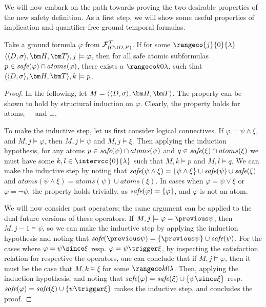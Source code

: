 We will now embark on the path towards proving the two desirable
properties of the new safety definition. As a first step, we will show
some useful properties of implication and quantifier-free ground
temporal formulas.

\begin{lemma}\label{lemma:safe-atomic-subformula-satisfied}
  Take a ground formula $\varphi$ from $\mathcal{F}_{(C \cup D,P)}^\mathcal{T}$. If for some
  $\rangeco{j}{0}{\lambda}$\\ $\qthandt,j \models \varphi$, then for
  all safe atomic subformulas
  $p \in \textit{safe}(\varphi) \cap atoms(\varphi)$, there exists a
  $\kinlambda$, such that $\qthandt,k \models p$.
\end{lemma}
\begin{proof}
  In the following, let $M=\qthandt$. The property can be shown to
  hold by structural induction on $\varphi$. Clearly, the property
  holds for atoms, $\top$ and $\bot$.

  To make the inductive step, let us first consider logical
  connectives. If $\varphi = \psi \wedge \xi$, and
  $M,j \models \varphi$, then $M,j \models \psi$ and
  $M,j \models \xi$. Then applying the induction hypothesis, for any
  atoms $p \in \textit{safe}(\psi) \cap atoms(\psi)$ and
  $q \in \textit{safe}(\xi) \cap atoms(\xi)$ we must have some
  $k,l \in \intervcc{0}{\lambda}$ such that $M,k \models p$ and
  $M,l \models q$. We can make the inductive step by noting that
  $\textit{safe}(\psi \wedge \xi) = \{ \psi \wedge \xi \} \cup \textit{safe}(\psi)
  \cup \textit{safe}(\xi)$ and
  $atoms(\psi \wedge \xi) = atoms(\psi) \cup atoms(\xi)$. In cases
  when $\varphi = \psi \vee \xi$ or $\varphi = \neg \psi$, the
  property holds trivially, as $\textit{safe}(\varphi) = \{ \varphi \}$, and
  $\varphi$ is not an atom.

  We will now consider past operators; the same argument can be
  applied to the dual future versions of these operators. If
  $M,j \models \varphi = \previous \psi$, then $M,j-1 \models \psi$,
  so we can make the inductive step by applying the induction
  hypothesis and noting that
  $\safe{\previous \psi} = \{ \previous \psi \} \cup \safe{\psi}$. For
  the cases where $\varphi = \psi \since \xi$ resp.
  $\varphi = \psi \trigger \xi$, by inspecting the satisfaction relation for
  respective the operators, one can conclude that if
  $M,j \models \varphi$, then it must be the case that
  $M,k \models \xi$ for some $\kinlambda$. Then, applying the
  induction hypothesis, and noting that
  $\safe{\varphi} = \safe{\xi} \cup \{ \psi \since \xi \}$
  resp. $\safe{\varphi} = \safe{\xi} \cup \{ \psi \trigger \xi \}$
  makes the inductive step, and concludes the proof.
  
\end{proof}

